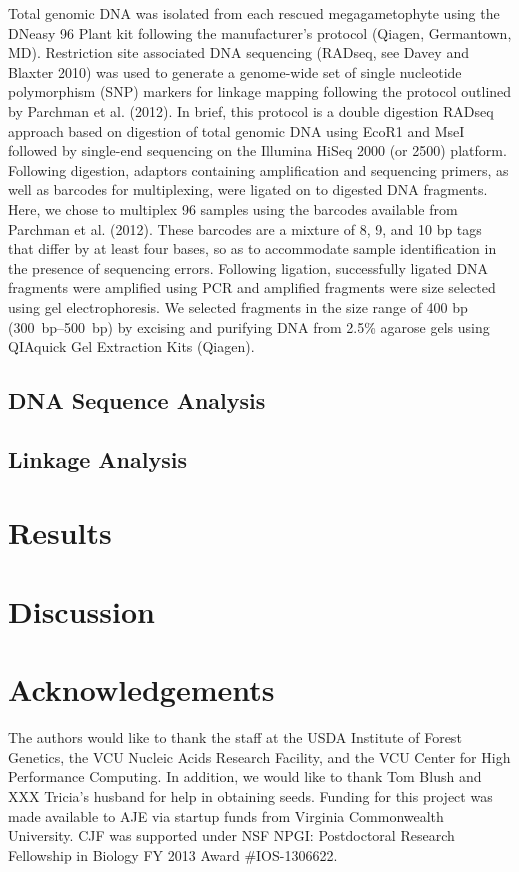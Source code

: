 \documentclass[11pt]{article}
\begin{document}
Total genomic DNA was isolated from each rescued megagametophyte using the DNeasy 96 Plant 
kit following the manufacturer’s protocol (Qiagen, Germantown, MD). Restriction site associated DNA 
sequencing (RADseq, see Davey and Blaxter 2010) was used to generate a genome-wide set of 
single nucleotide polymorphism (SNP) markers for linkage mapping following the protocol 
outlined by Parchman et al. (2012). In brief, this protocol is a double digestion RADseq 
approach based on digestion of total genomic DNA using EcoR1 and MseI followed by single-end 
sequencing on the Illumina HiSeq 2000 (or 2500) platform. Following digestion, adaptors 
containing amplification and sequencing primers, as well as barcodes for multiplexing, 
were ligated on to digested DNA fragments. Here, we chose to multiplex 96 samples using the 
barcodes available from Parchman et al. (2012). These barcodes are a mixture of 8, 9, and 
10 bp tags that differ by at least four bases, so as to accommodate sample identification in the 
presence of sequencing errors. Following ligation, successfully ligated DNA fragments were 
amplified using PCR and amplified fragments were size selected using gel electrophoresis. We selected 
fragments in the size range of 400 bp (\SIrange{300}{500}{bp}) by excising and purifying DNA from 2.5\% 
agarose gels using QIAquick Gel Extraction Kits (Qiagen).


\subsection{DNA Sequence Analysis}

\subsection{Linkage Analysis}

\section{Results}

\section{Discussion}

\section{Acknowledgements}

The authors would like to thank the staff at the USDA Institute of Forest Genetics, the 
VCU Nucleic Acids Research Facility, and the VCU Center for High Performance Computing. 
In addition, we would like to thank Tom Blush and XXX Tricia’s husband for help in obtaining 
seeds. Funding for this project was made available to AJE via startup funds from Virginia 
Commonwealth University. CJF was supported under NSF NPGI: Postdoctoral Research Fellowship 
in Biology FY 2013 Award \#IOS-1306622.
\end{document}
